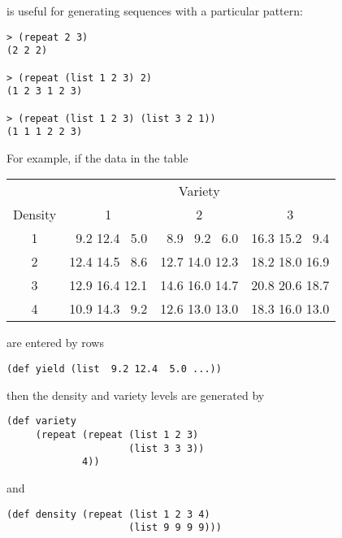 \begin{slide}{}
 is useful for generating sequences with a particular pattern:
\begin{verbatim}
> (repeat 2 3)
(2 2 2)

> (repeat (list 1 2 3) 2)
(1 2 3 1 2 3)

> (repeat (list 1 2 3) (list 3 2 1))
(1 1 1 2 2 3)
\end{verbatim}
\end{slide}

\begin{slide}{}
For example, if the data in the table
{\Large
\begin{center}
\begin{tabular}{|c|c|c|c|}
\hline
& \multicolumn{3}{c|}{Variety}\\
\cline{2-4}
Density & 1 & 2 & 3 \\
\hline
1 & ~9.2 12.4 ~5.0 & ~8.9 ~9.2 ~6.0 & 16.3 15.2 ~9.4 \\
\hline
2 & 12.4 14.5 ~8.6 & 12.7 14.0 12.3 & 18.2 18.0 16.9 \\
\hline
3 & 12.9 16.4 12.1 & 14.6 16.0 14.7 & 20.8 20.6 18.7 \\
\hline
4 & 10.9 14.3 ~9.2 & 12.6 13.0 13.0 & 18.3 16.0 13.0 \\
\hline
\end{tabular}
\end{center}}
are entered by rows
\begin{verbatim}
(def yield (list  9.2 12.4  5.0 ...))
\end{verbatim}
then the density and variety levels are generated by
\begin{verbatim}
(def variety 
     (repeat (repeat (list 1 2 3) 
                     (list 3 3 3))
             4))
\end{verbatim}
and
\begin{verbatim}
(def density (repeat (list 1 2 3 4)
                     (list 9 9 9 9)))
\end{verbatim}
\end{slide}


